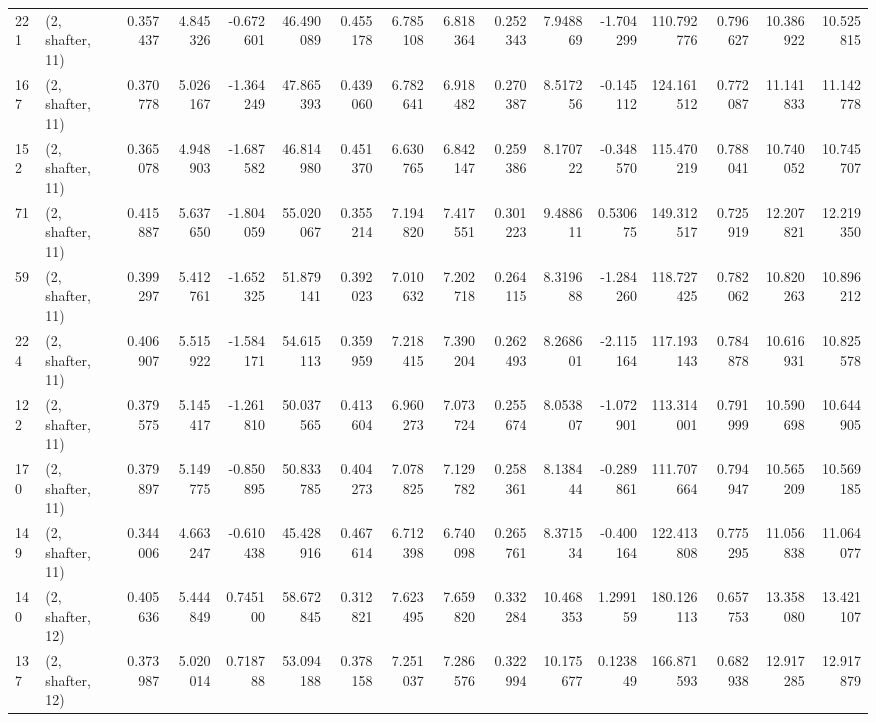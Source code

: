 \begin{tabular}{llrrrrrrrrrrrrrr}
221 &  (2, shafter, 11) &   0.357437 &   4.845326 & -0.672601 &   46.490089 &  0.455178 &   6.785108 &   6.818364 &  0.252343 &   7.948869 &  -1.704299 &  110.792776 &  0.796627 &  10.386922 &  10.525815 \\
167 &  (2, shafter, 11) &   0.370778 &   5.026167 & -1.364249 &   47.865393 &  0.439060 &   6.782641 &   6.918482 &  0.270387 &   8.517256 &  -0.145112 &  124.161512 &  0.772087 &  11.141833 &  11.142778 \\
152 &  (2, shafter, 11) &   0.365078 &   4.948903 & -1.687582 &   46.814980 &  0.451370 &   6.630765 &   6.842147 &  0.259386 &   8.170722 &  -0.348570 &  115.470219 &  0.788041 &  10.740052 &  10.745707 \\
71  &  (2, shafter, 11) &   0.415887 &   5.637650 & -1.804059 &   55.020067 &  0.355214 &   7.194820 &   7.417551 &  0.301223 &   9.488611 &   0.530675 &  149.312517 &  0.725919 &  12.207821 &  12.219350 \\
59  &  (2, shafter, 11) &   0.399297 &   5.412761 & -1.652325 &   51.879141 &  0.392023 &   7.010632 &   7.202718 &  0.264115 &   8.319688 &  -1.284260 &  118.727425 &  0.782062 &  10.820263 &  10.896212 \\
224 &  (2, shafter, 11) &   0.406907 &   5.515922 & -1.584171 &   54.615113 &  0.359959 &   7.218415 &   7.390204 &  0.262493 &   8.268601 &  -2.115164 &  117.193143 &  0.784878 &  10.616931 &  10.825578 \\
122 &  (2, shafter, 11) &   0.379575 &   5.145417 & -1.261810 &   50.037565 &  0.413604 &   6.960273 &   7.073724 &  0.255674 &   8.053807 &  -1.072901 &  113.314001 &  0.791999 &  10.590698 &  10.644905 \\
170 &  (2, shafter, 11) &   0.379897 &   5.149775 & -0.850895 &   50.833785 &  0.404273 &   7.078825 &   7.129782 &  0.258361 &   8.138444 &  -0.289861 &  111.707664 &  0.794947 &  10.565209 &  10.569185 \\
149 &  (2, shafter, 11) &   0.344006 &   4.663247 & -0.610438 &   45.428916 &  0.467614 &   6.712398 &   6.740098 &  0.265761 &   8.371534 &  -0.400164 &  122.413808 &  0.775295 &  11.056838 &  11.064077 \\
140 &  (2, shafter, 12) &   0.405636 &   5.444849 &  0.745100 &   58.672845 &  0.312821 &   7.623495 &   7.659820 &  0.332284 &  10.468353 &   1.299159 &  180.126113 &  0.657753 &  13.358080 &  13.421107 \\
137 &  (2, shafter, 12) &   0.373987 &   5.020014 &  0.718788 &   53.094188 &  0.378158 &   7.251037 &   7.286576 &  0.322994 &  10.175677 &   0.123849 &  166.871593 &  0.682938 &  12.917285 &  12.917879 \\

\end{tabular}
